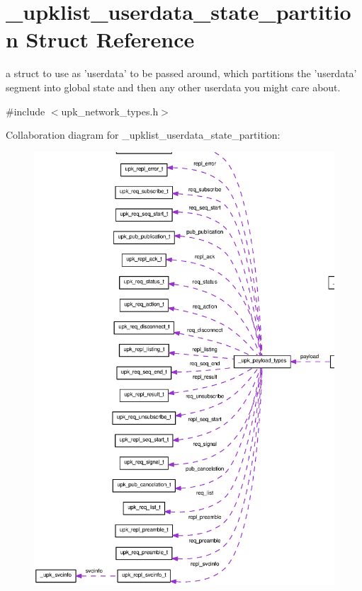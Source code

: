 \section{\_\-upklist\_\-userdata\_\-state\_\-partition Struct Reference}
\label{struct__upklist__userdata__state__partition}


a struct to use as 'userdata' to be passed around, which partitions the 'userdata' segment into global state and then any other userdata you might care about.  




{\ttfamily \#include $<$upk\_\-network\_\-types.h$>$}



Collaboration diagram for \_\-upklist\_\-userdata\_\-state\_\-partition:
\nopagebreak
\begin{figure}[H]
\begin{center}
\leavevmode
\includegraphics[width=400pt]{struct__upklist__userdata__state__partition__coll__graph}
\end{center}
\end{figure}
